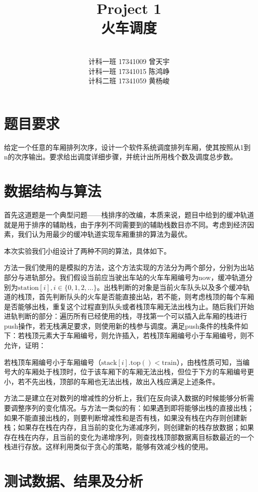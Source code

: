 \documentclass[12pt,UTF8]{ctexart}
\title{{\Huge Project 1\\火车调度}}
\author{\vspace{200pt}\quad\\
计科一班 17341009 曾天宇\\
计科一班 17341015 陈鸿峥\\
计科二班 17341059 黄杨峻}
\date{}
\begin{document}
\clearpage\maketitle
\thispagestyle{empty}

\newpage
\tableofcontents
\setcounter{page}{1}

\section{题目要求}
给定一个任意的车厢排列次序，设计一个软件系统调度排列车厢，使其按照从1到n的次序输出。要求给出调度详细步骤，并统计出所用栈个数及调度总步数。

\section{数据结构与算法}
首先这道题是一个典型问题——栈排序的改编，本质来说，题目中给到的缓冲轨道就是用于排序的辅助栈，由于序列不同需要到的辅助栈数目亦不同。考虑到经济因素，我们认为用最少的缓冲轨道实现车厢重排的算法为最优。

本次实验我们小组设计了两种不同的算法，具体如下。

方法一我们使用的是模拟的方法，这个方法实现的方法分为两个部分，分别为出站部分与进轨部分。我们假设当前应当驶出车站的火车车厢编号为$\text{now}$，缓冲轨道分别为$\text{station}[i],i\in\{0,1,2,\ldots\}$。出栈判断的对象是当前火车队头以及多个缓冲轨道的栈顶，首先判断队头的火车是否能直接出站，若不能，则考虑栈顶的每个车厢是否能够出栈，重复这个过程直到队头或者栈顶车厢无法出栈为止。随后我们开始进轨判断的部分：遍历所有已经使用的栈，寻找第一个可以插入此车厢的栈进行push操作，若无栈满足要求，则使用新的栈参与调度。满足push条件的栈条件如下：若栈顶元素大于车厢编号，则允许插入，若栈顶车厢编号小于车厢编号，则不允许，证明：

若栈顶车厢编号小于车厢编号（$\text{stack}[i].\text{top}()<\text{train}$），由栈性质可知，当编号大的车厢处于栈顶时，位于该车厢下的车厢无法出栈，但位于下方的车厢编号更小，若不先出栈，顶部的车厢也无法出栈，故出入栈应满足上述条件。

方法二是建立在对数列的增减性的分析上，我们在反向读入数据的时候能够分析需要调整序列的变化情况。与方法一类似的有：如果遇到即将能够出栈的直接出栈；如果不能直接出栈的，则要判断增减性和是否有栈，如果没有栈在内存则创建新栈；如果存在栈在内存，且当前的变化为递减序列，则创建新的栈存放数据；如果存在栈在内存，且当前的变化为递增序列，则查找栈顶部数据离目标数最近的一个栈进行存放。这样利用类似于贪心的策略，能够有效减少栈的使用。

\newpage
\section{测试数据、结果及分析}
\end{document}
